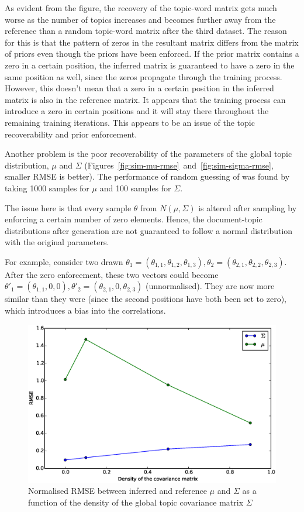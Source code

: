 \documentclass[12pt,a4paper,twoside,openright]{report}
\begin{document}
As evident from the figure, the recovery of the topic-word matrix gets much worse as the number of topics increases and becomes further away from the reference than a random topic-word matrix after the third dataset. The reason for this is that the pattern of zeros in the resultant matrix differs from the matrix of priors even though the priors have been enforced. If the prior matrix contains a zero in a certain position, the inferred matrix is guaranteed to have a zero in the same position as well, since the zeros propagate through the training process. However, this doesn't mean that a zero in a certain position in the inferred matrix is also in the reference matrix. It appears that the training process can introduce a zero in certain positions and it will stay there throughout the remaining training iterations. This appears to be an issue of the topic recoverability and prior enforcement.

Another problem is the poor recoverability of the parameters of the global topic distribution, $\mu$ and $\Sigma$ (Figures~\ref{fig:sim-mu-rmse}~and~\ref{fig:sim-sigma-rmse}, smaller RMSE is better). The performance of random guessing of was found by taking 1000 samples for $\mu$ and 100 samples for $\Sigma$.

The issue here is that every sample $\theta$ from $N(\mu, \Sigma)$ is altered after sampling by enforcing a certain number of zero elements. Hence, the document-topic distributions after generation are not guaranteed to follow a normal distribution with the original parameters.

For example, consider two drawn $\theta_1 = (\theta_{1,1}, \theta_{1,2}, \theta_{1,3}), \theta_2 = (\theta_{2,1}, \theta_{2,2}, \theta_{2,3})$. After the zero enforcement, these two vectors could become $\theta'_1 = (\theta_{1,1}, 0, 0), \theta'_2 = (\theta_{2,1}, 0, \theta_{2,3})$ (unnormalised). They are now more similar than they were (since the second positions have both been set to zero), which introduces a bias into the correlations.

\begin{figure}[!htb]
\includegraphics[width=\textwidth]{sim-sigmadensity-musigma.eps}
\caption{Normalised RMSE between inferred and reference $\mu$ and $\Sigma$ as a function of the density of the global topic covariance matrix $\Sigma$}
\label{fig:sim-sigmadensity-musigma}
\end{figure}
\end{document}
